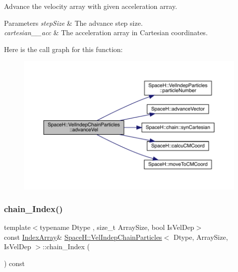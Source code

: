 Advance the velocity array with given acceleration array. 


\begin{DoxyParams}{Parameters}
{\em step\+Size} & The advance step size. \\
\hline
{\em cartesian_\+\_\+acc} & The acceleration array in Cartesian coordinates. \\
\hline
\end{DoxyParams}
Here is the call graph for this function\+:
\nopagebreak
\begin{figure}[H]
\begin{center}
\leavevmode
\includegraphics[width=350pt]{class_space_h_1_1_vel_indep_chain_particles_ae5253fbb69161c625f878de540618eb7_cgraph}
\end{center}
\end{figure}
\mbox{\label{class_space_h_1_1_vel_indep_chain_particles_a4136b399758a4547ce22024318d9b654}} 
\subsubsection{\texorpdfstring{chain_\+Index()}{chainIndex()}\hspace{0.1cm}{\footnotesize\ttfamily [1/4]}}
{\footnotesize\ttfamily template$<$typename Dtype , size\+\_\+t Array\+Size, bool Is\+Vel\+Dep$>$ \\
const \mbox{\hyperlink{class_space_h_1_1_vel_indep_chain_particles_a48b9183f8d68fe8af42bf405125d450c}{Index\+Array}}\& \mbox{\hyperlink{class_space_h_1_1_vel_indep_chain_particles}{Space\+H\+::\+Vel\+Indep\+Chain\+Particles}}$<$ Dtype, Array\+Size, Is\+Vel\+Dep $>$\+::chain_\+Index (\begin{DoxyParamCaption}{ }\end{DoxyParamCaption}) const\hspace{0.3cm}{\ttfamily [inline]}}



